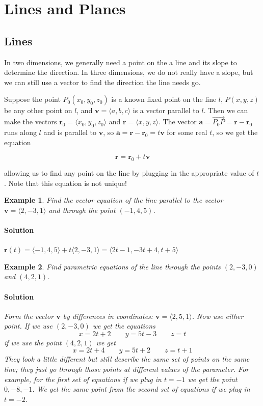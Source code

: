 \documentclass[letterpaper, 11pt, openany]{book}
\theoremstyle{mytheoremstyle}
\theoremstyle{myexamplestyle}
\newtheorem{example}{Example}[section]
\newenvironment{solution}{\paragraph{\sffamily \smaller \fontseries{b}\selectfont Solution}}{\hfill\faSquare}
\begin{document}
\section{Lines and Planes}
\setcounter{figure}{0}
\subsection{Lines}
In two dimensions, we generally need a point on the a line and its slope to determine the direction. In three dimensions, we do not really have a slope, but we can still use a vector to find the direction the line needs go.

Suppose the point \(P_0 (x_0, y_0, z_0)\) is a known fixed point on the line \(l\), \(P(x,y,z)\) be any other point on \(l\), and \(\mathbf{v} = \langle a, b, c\rangle\) is a vector parallel to \(l\). Then we can make the vectors \(\mathbf{r}_0 = \langle x_0, y_0, z_0\rangle\) and \(\mathbf{r} = \langle x,y,z\rangle\). The vector \(\mathbf{a} = \overrightarrow{P_{0}P} = \mathbf{r} - \mathbf{r}_{0}\) runs along \(l\) and is parallel to \(\mathbf{v}\), so \(\mathbf{a} = \mathbf{r} - \mathbf{r}_{0} = t\mathbf{v}\) for some real \(t\), so we get the equation

\[ \mathbf{r} = \mathbf{r}_{0} + t\mathbf{v}\]

allowing us to find any point on the line by plugging in the appropriate value of \(t\). Note that this equation is not unique!

\begin{example}\label{e:3dline}
    Find the vector equation of the line parallel to the vector \(\mathbf{v} = \langle 2, -3, 1\rangle\) and through the point \((-1, 4, 5)\).
    \begin{solution}
        \(\mathbf{r}(t) = \langle -1, 4, 5\rangle + t\langle 2, -3, 1\rangle = \langle 2t - 1, -3t + 4, t + 5\rangle\)
    \end{solution}
\end{example}

\begin{example}\label{e:3dline-two-points}
    Find parametric equations of the line through the points \((2,-3, 0)\) and \((4,2,1)\).
    \begin{solution}
        Form the vector \(\mathbf{v}\) by differences in coordinates: \(\mathbf{v} = \langle 2, 5, 1\rangle\). Now use either point. If we use \((2,-3, 0)\) we get the equations
        \[x = 2t + 2 \qquad y = 5t - 3 \qquad z = t\]
        if we use the point \((4,2,1)\) we get
        \[x = 2t + 4 \qquad y = 5t + 2 \qquad z = t + 1\]
        They look a little different but still describe the same set of points on the same line; they just go through those points at different values of the parameter. For example, for the first set of equations if we plug in \(t = -1\) we get the point \(0, -8, -1\). We get the same point from the second set of equations if we plug in \(t = -2\).
    \end{solution}
\end{example}
\end{document}
